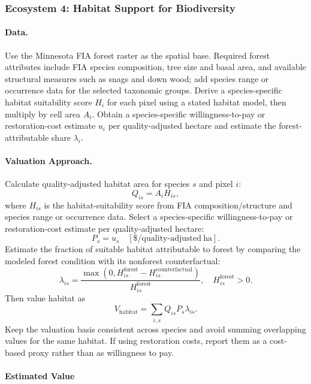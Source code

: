 \documentclass[11pt]{article}
\begin{document}
\subsubsection{Ecosystem 4: Habitat Support for Biodiversity}


\paragraph{Data.}
Use the Minnesota FIA forest raster as the spatial base. Required forest attributes include FIA species composition, tree size and basal area, and available structural measures such as snags and down wood; add species range or occurrence data for the selected taxonomic groups. Derive a species-specific habitat suitability score $H_i$ for each pixel using a stated habitat model, then multiply by cell area $A_i$. Obtain a species-specific willingness-to-pay or restoration-cost estimate $u_i$ per quality-adjusted hectare and estimate the forest-attributable share $\lambda_i$.

\paragraph{Valuation Approach.}
Calculate quality-adjusted habitat area for species $s$ and pixel $i$:
\[
Q_{is}=A_i H_{is},
\]
where $H_{is}$ is the habitat-suitability score from FIA composition/structure and species range or occurrence data. Select a species-specific willingness-to-pay or restoration-cost estimate per quality-adjusted hectare:
\[
P_s=u_s\quad [\$/\mathrm{quality\mbox{-}adjusted\ ha}].
\]
Estimate the fraction of suitable habitat attributable to forest by comparing the modeled forest condition with its nonforest counterfactual:
\[
\lambda_{is}=\frac{\max(0,H_{is}^{\mathrm{forest}}-H_{is}^{\mathrm{counterfactual}})}{H_{is}^{\mathrm{forest}}},\quad H_{is}^{\mathrm{forest}}>0.
\]
Then value habitat as
\[
V_{\mathrm{habitat}}=\sum_{i,s} Q_{is}P_s\lambda_{is}.
\]
Keep the valuation basis consistent across species and avoid summing overlapping values for the same habitat. If using restoration costs, report them as a cost-based proxy rather than as willingness to pay.

\paragraph{Estimated Value}
\end{document}
